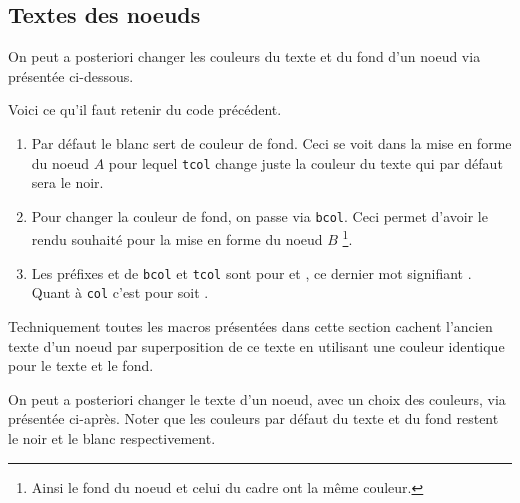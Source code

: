 \documentclass[12pt,a4paper]{article}
\begin{document}

\subsection{Textes des noeuds}


On peut a posteriori changer les couleurs du texte et du fond d'un noeud via  présentée ci-dessous.



Voici ce qu'il faut retenir du code précédent.

\begin{enumerate}
	\item Par défaut le blanc sert de couleur de fond. Ceci se voit dans la mise en forme du noeud $A$ pour lequel \verb#tcol# change juste la couleur du texte qui par défaut sera le noir.
	
	\item Pour changer la couleur de fond, on passe via \verb#bcol#. Ceci permet d'avoir le rendu souhaité pour la mise en forme du noeud $B$
	      \footnote{
	      	Ainsi le fond du noeud et celui du cadre ont la même couleur.
		   }.
	
	\item Les préfixes  et  de \verb#bcol# et \verb#tcol# sont pour  et , ce dernier mot signifiant .
	      Quant à \verb#col# c'est pour  soit .
\end{enumerate}



\begin{remark}
	Techniquement toutes les macros présentées dans cette section cachent l'ancien texte d'un noeud par superposition de ce texte en utilisant une couleur identique pour le texte et le fond.  
\end{remark}





On peut a posteriori changer le texte d'un noeud, avec un choix des couleurs, via  présentée ci-après.
Noter que les couleurs par défaut du texte et du fond restent le noir et le blanc respectivement.
\end{document}
